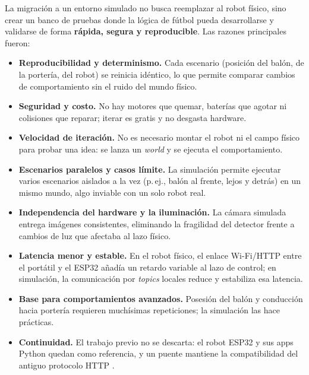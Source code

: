 \documentclass[11pt,a4paper]{article}
\newcommand{\code}[1]{\texttt{\detokenize{#1}}}
\begin{document}
La migración a un entorno simulado no busca reemplazar al robot físico, sino crear un banco de
pruebas donde la lógica de fútbol pueda desarrollarse y validarse de forma \textbf{rápida, segura
y reproducible}. Las razones principales fueron:

\begin{itemize}
  \item \textbf{Reproducibilidad y determinismo.} Cada escenario (posición del balón, de la portería,
  del robot) se reinicia idéntico, lo que permite comparar cambios de comportamiento sin el ruido
  del mundo físico.
  \item \textbf{Seguridad y costo.} No hay motores que quemar, baterías que agotar ni colisiones que
  reparar; iterar es gratis y no desgasta hardware.
  \item \textbf{Velocidad de iteración.} No es necesario montar el robot ni el campo físico para probar
  una idea: se lanza un \emph{world} y se ejecuta el comportamiento.
  \item \textbf{Escenarios paralelos y casos límite.} La simulación permite ejecutar varios escenarios
  aislados a la vez (p.\,ej., balón al frente, lejos y detrás) en un mismo mundo, algo inviable con un
  solo robot real.
  \item \textbf{Independencia del hardware y la iluminación.} La cámara simulada entrega imágenes
  consistentes, eliminando la fragilidad del detector frente a cambios de luz que afectaba al lazo físico.
  \item \textbf{Latencia menor y estable.} En el robot físico, el enlace Wi\mbox{-}Fi/HTTP entre el
  portátil y el ESP32 añadía un retardo variable al lazo de control; en simulación, la comunicación por
  \emph{topics} locales reduce y estabiliza esa latencia.
  \item \textbf{Base para comportamientos avanzados.} Posesión del balón y conducción hacia portería
  requieren muchísimas repeticiones; la simulación las hace prácticas.
  \item \textbf{Continuidad.} El trabajo previo no se descarta: el robot ESP32 y sus apps Python quedan
  como referencia, y un puente mantiene la compatibilidad del antiguo protocolo HTTP \code{/move}.
\end{itemize}
\end{document}
